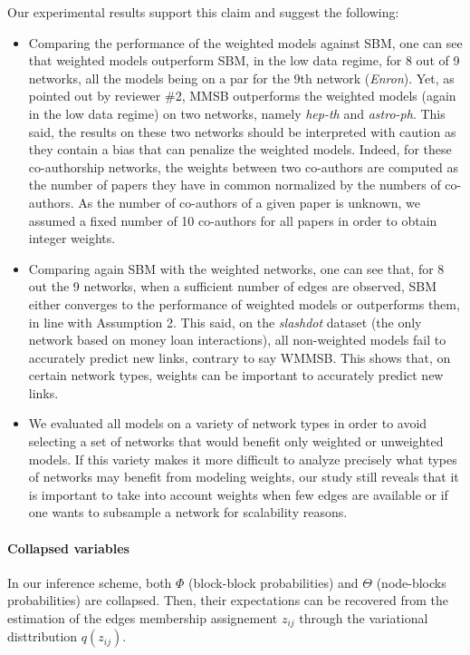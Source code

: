 \documentclass{article}
\begin{document}
%
Our experimental results support this claim and suggest the following:
%
\begin{itemize}
\item Comparing the performance of the weighted models against SBM, one can see that weighted models outperform SBM, in the low data regime, for 8 out of 9 networks, all the models being on a par for the 9th network (\textit{Enron}). Yet, as pointed out by reviewer \#2, MMSB outperforms the weighted models (again in the low data regime) on two networks, namely \textit{hep-th} and \textit{astro-ph}. This said, the results on these two networks should be interpreted with caution as they contain a bias that can penalize the weighted models. Indeed, for these co-authorship networks, the weights between two co-authors are computed as the number of papers they have in common normalized by the numbers of co-authors. As the number of co-authors of a given paper is unknown, we assumed a fixed number of 10 co-authors for all papers in order to obtain integer weights.
\item Comparing again SBM with the weighted networks, one can see that, for 8 out the 9 networks, when a sufficient number of edges are observed, SBM either converges to the performance of weighted models or outperforms them, in line with Assumption 2. This said, on the \textit{slashdot} dataset (the only network based on money loan interactions), all non-weighted models fail to accurately predict new links, contrary to say WMMSB. This shows that, on certain network types, weights can be important to accurately predict new links.
\item We evaluated all models on a variety of network types in order to avoid selecting a set of networks that would benefit only weighted or unweighted models. If this variety makes it more difficult to analyze precisely what types of networks may benefit from modeling weights, our study still reveals that it is important to take into account weights when few edges are available or if one wants to subsample a network for scalability reasons.
\end{itemize}

\paragraph{}

\paragraph{Collapsed variables} In our inference scheme, both $\Phi$ (block-block probabilities) and $\Theta$ (node-blocks probabilities) are collapsed. Then, their expectations can be recovered from the estimation of the edges membership assignement $z_{ij}$ through the variational disttribution $q(z_{ij})$.
\end{document}
